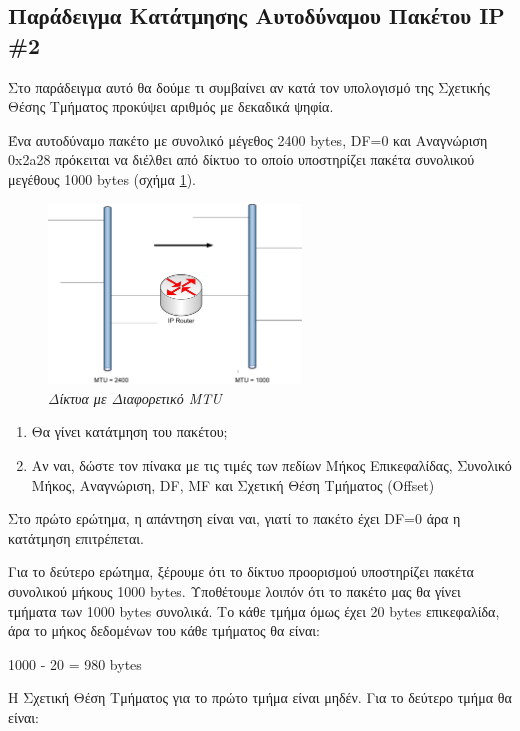 \subsection*{Παράδειγμα Κατάτμησης Αυτοδύναμου Πακέτου IP \#2}

Στο παράδειγμα αυτό θα δούμε τι συμβαίνει αν κατά τον υπολογισμό της Σχετικής Θέσης Τμήματος προκύψει αριθμός με δεκαδικά ψηφία. 

Ένα αυτοδύναμο πακέτο με συνολικό μέγεθος 2400 bytes, DF=0 και Αναγνώριση 0x2a28 πρόκειται να διέλθει από δίκτυο το οποίο υποστηρίζει πακέτα συνολικού μεγέθους 1000 bytes (σχήμα \ref{3-9}).

\begin{figure}[!ht]
  \centering
  \includegraphics[width=0.60\textwidth]{images/chapter3/3-9}
  \caption {\textsl{Δίκτυα με Διαφορετικό MTU}}
  \label{3-9}
\end{figure} 

\begin{enumerate}
\item Θα γίνει κατάτμηση του πακέτου;
\item Αν ναι, δώστε τον πίνακα με τις τιμές των πεδίων Μήκος Επικεφαλίδας, Συνολικό Μήκος, Αναγνώριση, DF, MF και Σχετική Θέση Τμήματος (Offset)
\end{enumerate}

Στο πρώτο ερώτημα, η απάντηση είναι ναι, γιατί το πακέτο έχει DF=0 άρα η κατάτμηση επιτρέπεται.

Για το δεύτερο ερώτημα, ξέρουμε ότι το δίκτυο προορισμού υποστηρίζει πακέτα συνολικού μήκους 1000 bytes. Υποθέτουμε λοιπόν ότι το πακέτο μας θα γίνει τμήματα των 1000 bytes συνολικά. Το κάθε τμήμα όμως έχει 20 bytes επικεφαλίδα, άρα το μήκος δεδομένων του κάθε τμήματος θα είναι:

\begin{center}
1000 - 20 = 980 bytes
\end{center}

Η Σχετική Θέση Τμήματος για το πρώτο τμήμα είναι μηδέν. Για το δεύτερο τμήμα θα είναι:

